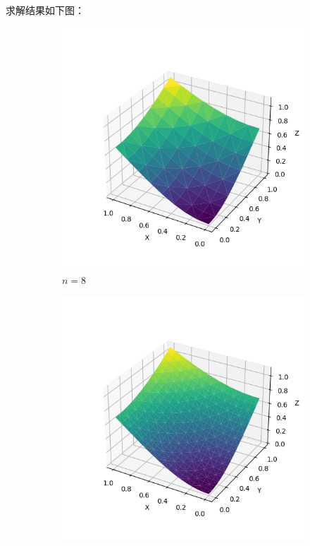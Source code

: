 \documentclass[lang=cn,a4paper,newtx,bibend=bibtex]{elegantpaper}
\begin{document}
求解结果如下图：

\begin{figure}[H]
  \centering
  \begin{subfigure}[b]{0.18\textwidth}
      \includegraphics[width=\textwidth]{../../res_bac/res-[data|3-mixed-regular-a8].png}
      \caption{$n =  8$}
  \end{subfigure}
  \hfill
  \begin{subfigure}[b]{0.18\textwidth}
      \includegraphics[width=\textwidth]{../../res_bac/res-[data|3-mixed-regular-b16].png}

\end{subfigure}
\end{figure}
\end{document}
